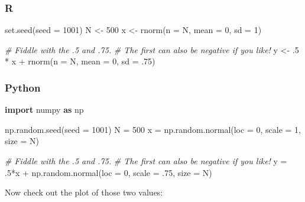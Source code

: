 \documentclass[
  letterpaper,
]{krantz}
\newenvironment{Shaded}{}{}
\newcommand{\AttributeTok}[1]{\textcolor[rgb]{0.49,0.56,0.16}{#1}}
\newcommand{\CommentTok}[1]{\textcolor[rgb]{0.38,0.63,0.69}{\textit{#1}}}
\newcommand{\DecValTok}[1]{\textcolor[rgb]{0.25,0.63,0.44}{#1}}
\newcommand{\FloatTok}[1]{\textcolor[rgb]{0.25,0.63,0.44}{#1}}
\newcommand{\FunctionTok}[1]{\textcolor[rgb]{0.02,0.16,0.49}{#1}}
\newcommand{\ImportTok}[1]{\textcolor[rgb]{0.00,0.50,0.00}{\textbf{#1}}}
\newcommand{\NormalTok}[1]{#1}
\newcommand{\OperatorTok}[1]{\textcolor[rgb]{0.40,0.40,0.40}{#1}}
\newcommand{\OtherTok}[1]{\textcolor[rgb]{0.00,0.44,0.13}{#1}}
\newcommand{\SpecialCharTok}[1]{\textcolor[rgb]{0.25,0.44,0.63}{#1}}
\begin{document}
\subsubsection{R}

\begin{Shaded}
\begin{Highlighting}[]
\FunctionTok{set.seed}\NormalTok{(}\AttributeTok{seed =} \DecValTok{1001}\NormalTok{)}
\NormalTok{N }\OtherTok{\textless{}{-}} \DecValTok{500}
\NormalTok{x }\OtherTok{\textless{}{-}} \FunctionTok{rnorm}\NormalTok{(}\AttributeTok{n =}\NormalTok{ N, }\AttributeTok{mean =} \DecValTok{0}\NormalTok{, }\AttributeTok{sd =} \DecValTok{1}\NormalTok{)}

\CommentTok{\# Fiddle with the .5 and .75.}
\CommentTok{\# The first can also be negative if you like!}
\NormalTok{y }\OtherTok{\textless{}{-}}\NormalTok{ .}\DecValTok{5} \SpecialCharTok{*}\NormalTok{ x }\SpecialCharTok{+} \FunctionTok{rnorm}\NormalTok{(}\AttributeTok{n =}\NormalTok{ N, }\AttributeTok{mean =} \DecValTok{0}\NormalTok{, }\AttributeTok{sd =}\NormalTok{ .}\DecValTok{75}\NormalTok{)}
\end{Highlighting}
\end{Shaded}

\subsubsection{Python}

\begin{Shaded}
\begin{Highlighting}[]
\ImportTok{import}\NormalTok{ numpy }\ImportTok{as}\NormalTok{ np}

\NormalTok{np.random.seed(seed }\OperatorTok{=} \DecValTok{1001}\NormalTok{)}
\NormalTok{N }\OperatorTok{=} \DecValTok{500}
\NormalTok{x }\OperatorTok{=}\NormalTok{ np.random.normal(loc }\OperatorTok{=} \DecValTok{0}\NormalTok{, scale }\OperatorTok{=} \DecValTok{1}\NormalTok{, size }\OperatorTok{=}\NormalTok{ N)}

\CommentTok{\# Fiddle with the .5 and .75. }
\CommentTok{\# The first can also be negative if you like!}
\NormalTok{y }\OperatorTok{=} \FloatTok{.5}\OperatorTok{*}\NormalTok{x }\OperatorTok{+}\NormalTok{ np.random.normal(loc }\OperatorTok{=} \DecValTok{0}\NormalTok{, scale }\OperatorTok{=} \FloatTok{.75}\NormalTok{, size }\OperatorTok{=}\NormalTok{ N) }
\end{Highlighting}
\end{Shaded}

Now check out the plot of those two values:
\end{document}

